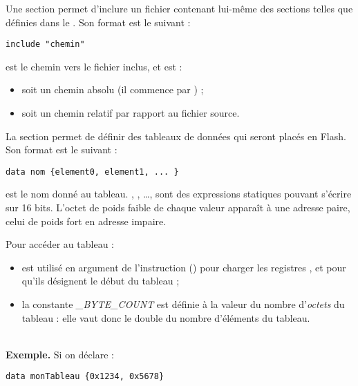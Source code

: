 
Une section  permet d'inclure un fichier contenant lui-même des sections telles que définies dans le .  Son format est le suivant :

\begin{lstlisting}[language=piccolo]
  include "chemin"
\end{lstlisting}

 est le chemin vers le fichier inclus, et est :
\begin{itemize}
  \item soit un chemin absolu (il commence par \piccolo{/}) ;
  \item soit un chemin relatif par rapport au fichier source.
\end{itemize}









La section  permet de définir des tableaux de données qui seront placés en Flash. Son format est le suivant :

\begin{lstlisting}[language=piccolo]
  data nom {element0, element1, ... }
\end{lstlisting}

 est le nom donné au tableau. , , …, sont des expressions statiques pouvant s'écrire sur 16 bits. L'octet de poids faible de chaque valeur apparaît à une adresse paire, celui de poids fort en adresse impaire.

Pour accéder au tableau :
\begin{itemize}
  \item {} est utilisé en argument de l'instruction  () pour charger les registres ,  et  pour qu'ils désignent le début du tableau ;
  \item la constante \emph{\small{\_BYTE\_COUNT}} est définie à la valeur du nombre d'\emph{octets} du tableau : elle vaut donc le double du nombre d'éléments du tableau.
\end{itemize}



~\\
\textbf{Exemple.} Si on déclare :
\begin{lstlisting}[language=piccolo]
  data monTableau {0x1234, 0x5678}
\end{lstlisting}

